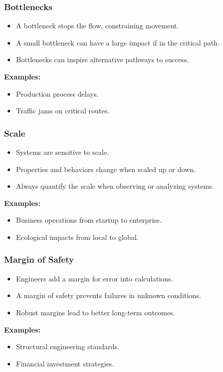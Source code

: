 \begin{frame}[fragile]\frametitle{Bottlenecks}
\begin{itemize}
    \item A bottleneck stops the flow, constraining movement.
    \item A small bottleneck can have a large impact if in the critical path.
    \item Bottlenecks can inspire alternative pathways to success.
\end{itemize}
\textbf{Examples:}
\begin{itemize}
    \item Production process delays.
    \item Traffic jams on critical routes.
\end{itemize}
\end{frame}

\begin{frame}[fragile]\frametitle{Scale}
\begin{itemize}
    \item Systems are sensitive to scale.
    \item Properties and behaviors change when scaled up or down.
    \item Always quantify the scale when observing or analyzing systems.
\end{itemize}
\textbf{Examples:}
\begin{itemize}
    \item Business operations from startup to enterprise.
    \item Ecological impacts from local to global.
\end{itemize}
\end{frame}

\begin{frame}[fragile]\frametitle{Margin of Safety}
\begin{itemize}
    \item Engineers add a margin for error into calculations.
    \item A margin of safety prevents failures in unknown conditions.
    \item Robust margins lead to better long-term outcomes.
\end{itemize}
\textbf{Examples:}
\begin{itemize}
    \item Structural engineering standards.
    \item Financial investment strategies.
\end{itemize}
\end{frame}

